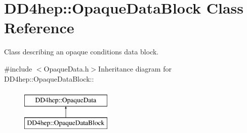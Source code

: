 \hypertarget{class_d_d4hep_1_1_opaque_data_block}{
\section{DD4hep::OpaqueDataBlock Class Reference}
\label{class_d_d4hep_1_1_opaque_data_block}
}


Class describing an opaque conditions data block.  


{\ttfamily \#include $<$OpaqueData.h$>$}Inheritance diagram for DD4hep::OpaqueDataBlock::\begin{figure}[H]
\begin{center}
\leavevmode
\includegraphics[height=2cm]{class_d_d4hep_1_1_opaque_data_block}
\end{center}
\end{figure}
